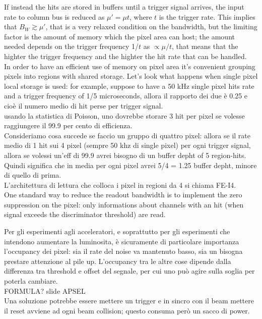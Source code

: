 \begin{titlepage}
If instead the hits are stored in buffers until a trigger signal arrives, the input rate
to column bus is reduced as $\mu'=\mu t$, where $t$ is the trigger rate.
This implies that $B_{W} \gtrsim \mu'$, that is a very relaxed condition on the
bandwidth, but the limiting factor is the amount of memory  which the pixel area
can host; the amount needed depends on the trigger frequency 1/$t$ as
$\propto\mu/t$, that means that the highter the trigger frequency and the highter
the hit rate that can be handled. \\
In order to have an efficient use of memory on pixel area it's convenient
grouping pixels into regions with shared storage. Let's look what happens when
single pixel local storage is used: for example, suppose to have a 50 kHz single
pixel hits rate and a trigger frequency of 1/5 microseconds, allora il rapporto dei due
è 0.25 e cioè il numero medio di hit perse per trigger signal.\\
usando la statistica di Poisson, uno dovrebbe storare 3 hit per pixel se volesse
raggiungere il 99.9 per cento di efficienza.\\
Consideriamo cosa succede se faccio un gruppo di quattro pixel: allora se il rate
medio di 1 hit sui 4 pixel (sempre 50 khz di single pixel) per ogni trigger signal, allora se volessi un'eff di 99.9
avrei bisogno di un buffer depht of 5 region-hits. Quindi significa che in media per
ogni pixel avrei 5/4 = 1.25 buffer depht, minore di quello di prima.\\
L'architettura di lettura che colloca i pixel in regioni da 4 si chiama FE-I4.\\

One standard way to reduce the readout bandwidth is to implement the zero suppression
on the pixel: only informations about channels with an hit (when signal exceeds
the discriminator threshold) are read.

Per gli esperimenti agli acceleratori, e soprattutto per gli esperimenti che
intendono aumentare la luminosita, è sicuramente di particolare importanza
l'occupancy dei pixel: sia il rate del noise va mantenuto basso, sia un
bisogna prestare attenzione al pile up.
L'occupancy tra le altre cose dipende dalla differenza tra threshold e offset del
segnale, per cui uno può agire sulla soglia per poterla cambiare.\\
FORMULA? slide APSEL\\
Una soluzione potrebbe essere mettere un trigger e in sincro con il beam mettere
il reset avviene ad ogni beam collision; questo consuma però un sacco di power. \\

\end{titlepage}
